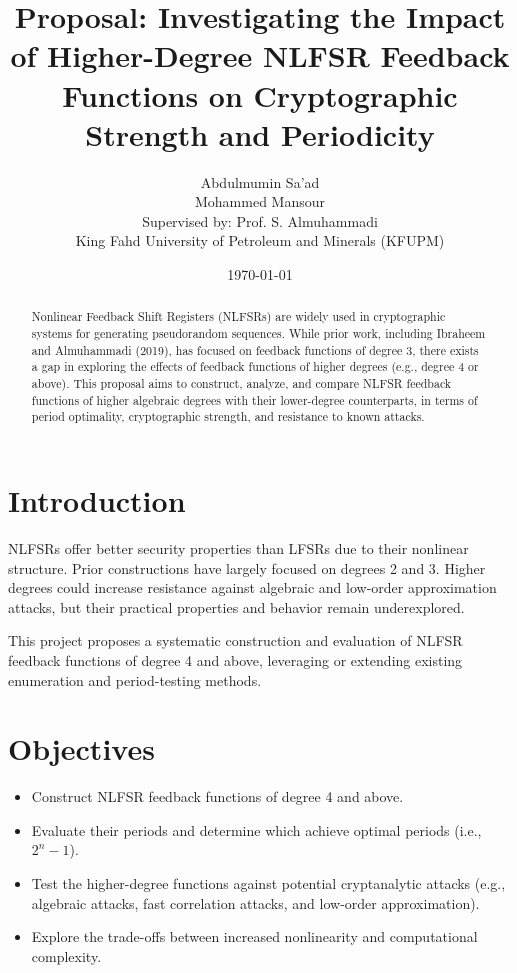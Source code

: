 \documentclass[11pt]{article}
\title{Proposal: Investigating the Impact of Higher-Degree NLFSR Feedback Functions on Cryptographic Strength and Periodicity}
\author{
    Abdulmumin Sa'ad \\ 
    Mohammed Mansour \\
    Supervised by: Prof. S. Almuhammadi \\
    King Fahd University of Petroleum and Minerals (KFUPM)
}
\date{\today}
\begin{document}
\maketitle

\begin{abstract}
Nonlinear Feedback Shift Registers (NLFSRs) are widely used in cryptographic systems for generating pseudorandom sequences. While prior work, including Ibraheem and Almuhammadi (2019), has focused on feedback functions of degree 3, there exists a gap in exploring the effects of feedback functions of higher degrees (e.g., degree 4 or above). This proposal aims to construct, analyze, and compare NLFSR feedback functions of higher algebraic degrees with their lower-degree counterparts, in terms of period optimality, cryptographic strength, and resistance to known attacks. 
\end{abstract}

\section{Introduction}
NLFSRs offer better security properties than LFSRs due to their nonlinear structure. Prior constructions have largely focused on degrees 2 and 3. Higher degrees could increase resistance against algebraic and low-order approximation attacks, but their practical properties and behavior remain underexplored.

This project proposes a systematic construction and evaluation of NLFSR feedback functions of degree 4 and above, leveraging or extending existing enumeration and period-testing methods.

\section{Objectives}
\begin{itemize}
    \item Construct NLFSR feedback functions of degree 4 and above.
    \item Evaluate their periods and determine which achieve optimal periods (i.e., $2^n - 1$).
    \item Test the higher-degree functions against potential cryptanalytic attacks (e.g., algebraic attacks, fast correlation attacks, and low-order approximation).
    \item Explore the trade-offs between increased nonlinearity and computational complexity.
\end{itemize}
\end{document}
